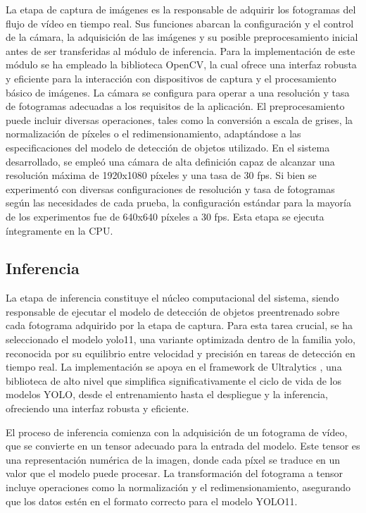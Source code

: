 \documentclass[11pt,spanish,listoffigures,listoftables]{tfgetsinf}
\begin{document}
La etapa de captura de imágenes es la responsable de adquirir los fotogramas del flujo de vídeo en tiempo real. Sus funciones abarcan la configuración y el control de la cámara, la adquisición de las imágenes y su posible preprocesamiento inicial antes de ser transferidas al módulo de inferencia. Para la implementación de este módulo se ha empleado la biblioteca OpenCV, la cual ofrece una interfaz robusta y eficiente para la interacción con dispositivos de captura y el procesamiento básico de imágenes. La cámara se configura para operar a una resolución y tasa de fotogramas adecuadas a los requisitos de la aplicación. El preprocesamiento puede incluir diversas operaciones, tales como la conversión a escala de grises, la normalización de píxeles o el redimensionamiento, adaptándose a las especificaciones del modelo de detección de objetos utilizado. En el sistema desarrollado, se empleó una cámara de alta definición capaz de alcanzar una resolución máxima de 1920x1080 píxeles y una tasa de 30 fps. Si bien se experimentó con diversas configuraciones de resolución y tasa de fotogramas según las necesidades de cada prueba, la configuración estándar para la mayoría de los experimentos fue de 640x640 píxeles a 30 fps. Esta etapa se ejecuta íntegramente en la CPU.

\subsection{Inferencia} \label{sec:inferencia}
La etapa de inferencia constituye el núcleo computacional del sistema, siendo responsable de ejecutar el modelo de detección de objetos preentrenado sobre cada fotograma adquirido por la etapa de captura. Para esta tarea crucial, se ha seleccionado el modelo \gls{yolo}11, una variante optimizada dentro de la familia \gls{yolo}, reconocida por su equilibrio entre velocidad y precisión en tareas de detección en tiempo real. La implementación se apoya en el framework de Ultralytics \cite{Jocher_Ultralytics_YOLO_2023}, una biblioteca de alto nivel que simplifica significativamente el ciclo de vida de los modelos YOLO, desde el entrenamiento hasta el despliegue y la inferencia, ofreciendo una interfaz robusta y eficiente.

El proceso de inferencia comienza con la adquisición de un fotograma de vídeo, que se convierte en un tensor adecuado para la entrada del modelo. Este tensor es una representación numérica de la imagen, donde cada píxel se traduce en un valor que el modelo puede procesar. La transformación del fotograma a tensor incluye operaciones como la normalización y el redimensionamiento, asegurando que los datos estén en el formato correcto para el modelo YOLO11.
\end{document}
